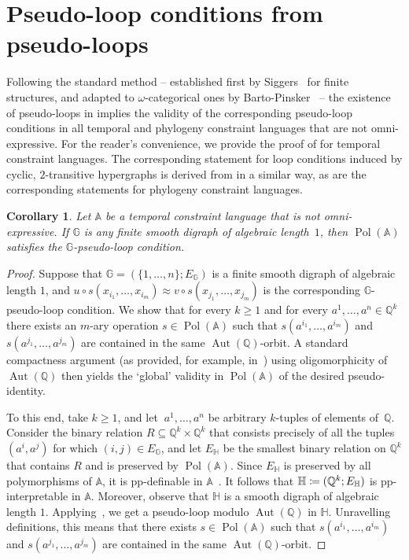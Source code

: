 \documentclass[a4paper,reqno, cleveref]{amsart}
\newcommand{\coloneqq}{\mathrel{\mathop:}\mathrel{\mkern-1.2mu}=}
\newtheorem{corollary}[theorem]{Corollary}
\newcommand{\Q}{\mathbb{Q}}
\DeclareMathOperator{\Pol}{Pol}
\DeclareMathOperator{\Aut}{Aut}
\newcommand{\sA}{\mathbb A}
\newcommand{\sG}{\mathbb G}
\newcommand{\sH}{\mathbb H}
\begin{document}
\section{Pseudo-loop conditions from pseudo-loops}
\label{sect:corollaries}
Following the standard method 
-- established first by Siggers~\cite{Siggers} for finite structures, and adapted to $\omega$-categorical ones by Barto-Pinsker~\cite{Topo} -- the existence of pseudo-loops in  implies the validity of the corresponding pseudo-loop conditions in all temporal and phylogeny constraint languages that are not omni-expressive.  For the reader's convenience, we provide the proof of  for temporal constraint languages. The corresponding statement for loop conditions induced by cyclic, $2$-transitive hypergraphs  is derived from  in a similar way, as are the corresponding statements for phylogeny constraint languages.  
\begin{corollary}
    Let $\sA$ be a temporal  constraint language that is not omni-expressive. If $\sG$ is any finite smooth digraph of algebraic length~$1$, then  $\Pol(\sA)$ satisfies the $\sG$-pseudo-loop condition.
\end{corollary}

\begin{proof} 
Suppose that $\sG=(\{1, \dots, n\}; E_{\sG}) $ is a finite smooth digraph of algebraic length $1$, and $u \circ s(x_{i_1} , \dots , x_{i_m} ) \approx v \circ s(x_{j_1} , \dots , x_{j_m} )$ is the corresponding $\sG$-pseudo-loop condition. 
%
We show that for every $k\geq 1$ and for every $a^1, \dots, a^n \in \Q^k$ there exists an $m$-ary operation $s \in \Pol(\sA)$ such that $s(a^{i_1}, \dots, a^{i_m}) $ and $s(a^{j_1}, \dots, a^{j_m}) $ are contained in the same $\Aut(\Q)$-orbit. A standard compactness argument (as provided, for example, in~\cite[Lemma 4.2]{Topo})  using oligomorphicity of $\Aut(\Q)$ then yields the `global' validity in $\Pol(\sA)$ of the desired pseudo-identity.  

To this end, take $k \geq 1$, and let  $\ a^1, \dots, a^n$ be arbitrary $k$-tuples of elements of~$\Q$.
Consider the binary relation $R\subseteq \Q^k \times \Q^k$ that consists precisely of all the tuples $(a^i, a^j)$  for which $(i,j)\in E_{\sG}$, and let $E_{\sH}$ be the smallest binary relation on $\Q^k$ that contains $R$ and is preserved by $\Pol(\sA)$.
Since $E_{\sH}$ is %
preserved by all polymorphisms of $\sA$, it is pp-definable in $\sA$~\cite{BodirskyNesetrilJLC}. It follows that $\sH\coloneqq(\Q^k; E_{\sH})$
is pp-interpretable in $\sA$. Moreover, observe that $\sH$ is a smooth digraph of algebraic length $1$.  Applying~, we get a pseudo-loop modulo $\Aut(\Q)$ in $\sH$. Unravelling definitions, this means that there exists $s \in \Pol(\sA)$  such that $ s( a^{i_1}, \dots,  a^{i_m})$ and $ s( a^{j_1}, \dots,  a^{j_m}) $ are contained in the same $\Aut(\Q)$-orbit. 
\end{proof}
\end{document}
